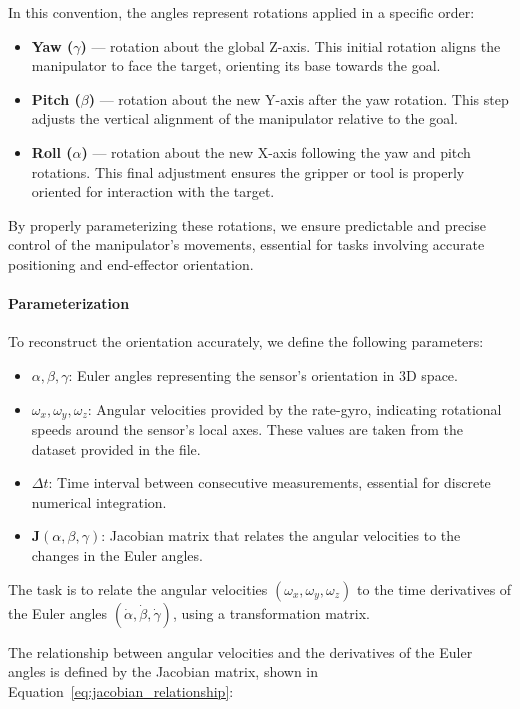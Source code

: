 \documentclass[12pt]{article}
\begin{document}
In this convention, the angles represent rotations applied in a specific order:
\begin{itemize}
    \item \textbf{Yaw (\(\gamma\))} — rotation about the global Z-axis. This initial rotation aligns the manipulator to face the target, orienting its base towards the goal.
    \item \textbf{Pitch (\(\beta\))} — rotation about the new Y-axis after the yaw rotation. This step adjusts the vertical alignment of the manipulator relative to the goal.
    \item \textbf{Roll (\(\alpha\))} — rotation about the new X-axis following the yaw and pitch rotations. This final adjustment ensures the gripper or tool is properly oriented for interaction with the target.
\end{itemize}

By properly parameterizing these rotations, we ensure predictable and precise control of the manipulator's movements, essential for tasks involving accurate positioning and end-effector orientation.

\paragraph{Parameterization}
To reconstruct the orientation accurately, we define the following parameters:
\begin{itemize}
    \item \(\alpha, \beta, \gamma\): Euler angles representing the sensor's orientation in 3D space.
    \item \(\omega_x, \omega_y, \omega_z\): Angular velocities provided by the rate-gyro, indicating rotational speeds around the sensor’s local axes. These values are taken from the dataset provided in the file.
    \item \(\Delta t\): Time interval between consecutive measurements, essential for discrete numerical integration.
    \item \(\mathbf{J}(\alpha, \beta, \gamma)\): Jacobian matrix that relates the angular velocities to the changes in the Euler angles.
\end{itemize}

The task is to relate the angular velocities \((\omega_x, \omega_y, \omega_z)\) to the time derivatives of the Euler angles \((\dot{\alpha}, \dot{\beta}, \dot{\gamma})\), using a transformation matrix.

The relationship between angular velocities and the derivatives of the Euler angles is defined by the Jacobian matrix, shown in Equation~\eqref{eq:jacobian_relationship}:
\end{document}
